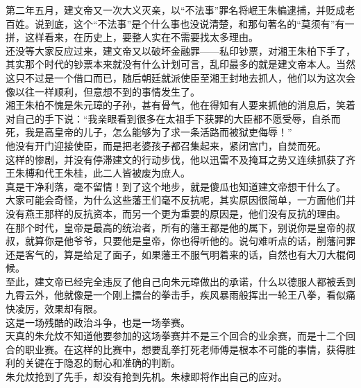 \begin{multicols}{\theparacolNo}
第二年五月，建文帝又一次大义灭亲，以“不法事”罪名将岷王朱楄逮捕，并贬成老百姓。说到底，这个“不法事”是个什么事也没说清楚，和那句著名的“莫须有”有一拼，这样看来，在历史上，要整人实在不需要找太多理由。\\

还没等大家反应过来，建文帝又以破坏金融罪——私印钞票，对湘王朱柏下手了，其实那个时代的钞票本来就没有什么计划可言，乱印最多的就是建文帝本人。当然这只不过是一个借口而已，随后朝廷就派使臣至湘王封地去抓人，他们以为这次会像以往一样顺利，但意想不到的事情发生了。\\

湘王朱柏不愧是朱元璋的子孙，甚有骨气，他在得知有人要来抓他的消息后，笑着对自己的手下说：“我亲眼看到很多在太祖手下获罪的大臣都不愿受辱，自杀而死，我是高皇帝的儿子，怎么能够为了求一条活路而被狱吏侮辱！”\\

他没有开门迎接使臣，而是把老婆孩子都召集起来，紧闭宫门，自焚而死。\\

这样的惨剧，并没有停滞建文的行动步伐，他以迅雷不及掩耳之势又连续抓获了齐王朱榑和代王朱桂，此二人皆被废为庶人。\\

真是干净利落，毫不留情！到了这个地步，就是傻瓜也知道建文帝想干什么了。\\

大家可能会奇怪，为什么这些藩王们毫不反抗呢，其实原因很简单，一方面他们并没有燕王那样的反抗资本，而另一个更为重要的原因是，他们没有反抗的理由。\\

在那个时代，皇帝是最高的统治者，所有的藩王都是他的属下，别说你是皇帝的叔叔，就算你是他爷爷，只要他是皇帝，你也得听他的。说句难听点的话，削藩问罪还是客气的，算是给足了面子，如果藩王不服气明着来的话，自然也有大刀大棍伺候。\\

至此，建文帝已经完全违反了他自己向朱元璋做出的承诺，什么以德服人都被丢到九霄云外，他就像是一个刚上擂台的拳击手，疾风暴雨般挥出一轮王八拳，看似痛快凌厉，效果却有限。\\

这是一场残酷的政治斗争，也是一场拳赛。\\

天真的朱允炆不知道他要参加的这场拳赛并不是三个回合的业余赛，而是十二个回合的职业赛。在这样的比赛中，想要乱拳打死老师傅是根本不可能的事情，获得胜利的关键在于隐忍的耐心和准确的判断。\\

朱允炆抢到了先手，却没有抢到先机。朱棣即将作出自己的应对。\\
\ifnum{}
	\end{multicols}
\fi
\newpage
